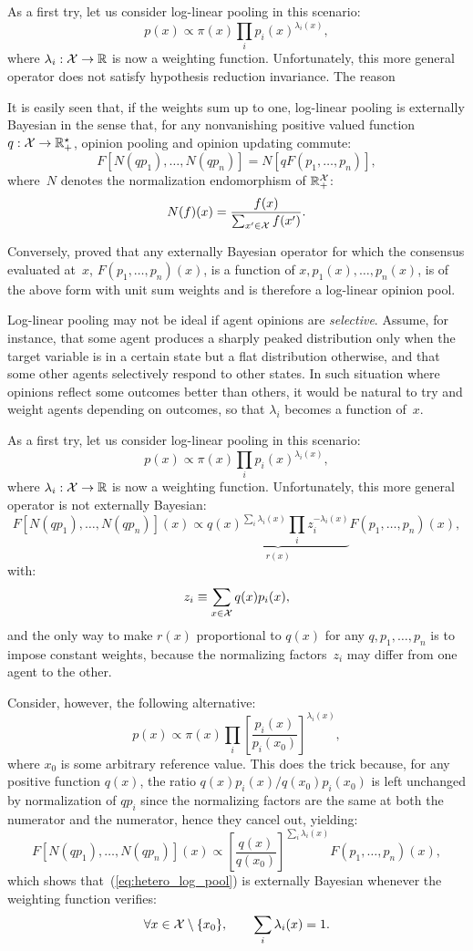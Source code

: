 \documentclass[english]{scrartcl}
\begin{document}
As a first try, let us consider log-linear pooling in this scenario:
$$
p(x)\propto \pi(x) \prod_i p_i(x)^{\lambda_i(x)},
$$
where $\lambda_i : {\cal X}\to\mathbb{R}$ is now a weighting function. Unfortunately, this more general operator does not satisfy hypothesis reduction invariance. The reason 

It is easily seen that, if the weights sum up to one, log-linear pooling is externally Bayesian in the sense that, for any nonvanishing positive valued function $q:{\cal X}\to \mathbb{R}^\star_+$, opinion pooling and opinion updating commute:
$$
F[N(q p_1), \ldots, N(q p_n)]
=
N[q F(p_1,\ldots, p_n)],
$$
where~$N$ denotes the normalization endomorphism of $\mathbb{R}_+^{\cal X}$:
$$
N(f)(x) = \frac{f(x)}{\sum_{x'\in{\cal X}} f(x')}
.
$$

Conversely, \cite{Genest-86b} proved that any externally Bayesian operator for which the consensus evaluated at~$x$, $F(p_1,\ldots,p_n)(x)$, is a function of $x,p_1(x),\ldots,p_n(x)$, is of the above form with unit sum weights and is therefore a log-linear opinion pool. 

Log-linear pooling may not be ideal if agent opinions are {\em selective}. Assume, for instance, that some agent produces a sharply peaked distribution only when the target variable is in a certain state but a flat distribution otherwise, and that some other agents selectively respond to other states. In such situation where opinions reflect some outcomes better than others, it would be natural to try and weight agents depending on outcomes, so that $\lambda_i$ becomes a function of~$x$. 

As a first try, let us consider log-linear pooling in this scenario:
$$
p(x)\propto \pi(x) \prod_i p_i(x)^{\lambda_i(x)},
$$
where $\lambda_i : {\cal X}\to\mathbb{R}$ is now a weighting function. Unfortunately, this more general operator is not externally Bayesian:
$$
F[N(q p_1), \ldots, N(q p_n)](x)
\propto
\underbrace{q(x)^{\sum_i \lambda_i(x)} \prod_i z_i^{-\lambda_i(x)}}_{r(x)}
F(p_1,\ldots, p_n)(x),
$$
with:
$$
z_i \equiv \sum_{x\in{\cal X}} q(x) p_i(x),
$$
and the only way to make $r(x)$ proportional to $q(x)$ for any $q, p_1,\ldots, p_n$ is to impose constant weights, because the normalizing factors~$z_i$ may differ from one agent to the other.

Consider, however, the following alternative:
\begin{equation}
\label{eq:hetero_log_pool}
p(x) \propto \pi(x) \prod_i \left[\frac{p_i(x)}{p_i(x_0)}\right]^{\lambda_i(x)},    
\end{equation}
where $x_0$ is some arbitrary reference value. This does the trick because, for any positive function $q(x)$, the ratio $q(x)p_i(x)/q(x_0)p_i(x_0)$ is left unchanged by normalization of $q p_i$ since the normalizing factors are the same at both the numerator and the numerator, hence they cancel out, yielding:
$$
F[N(q p_1), \ldots, N(q p_n)](x)
\propto
\left[\frac{q(x)}{q(x_0)}\right]^{\sum_i \lambda_i(x)}
F(p_1, \ldots, p_n)(x),
$$
which shows that~(\ref{eq:hetero_log_pool}) is externally Bayesian whenever the weighting function verifies:
$$
\forall x \in {\cal X}\setminus \{x_0\},
\qquad
\sum_i \lambda_i(x) = 1.
$$
\end{document}
